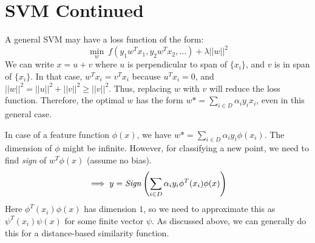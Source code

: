 \documentclass[12pt]{article}
\begin{document}
\section{SVM Continued}

A general SVM may have a loss function of the form:
$$\min_w \ f(y_1w^Tx_1, y_2w^Tx_2, \dots ) + \lambda ||w||^2$$
We can write $x=u+v$ where $u$ is perpendicular to span of $\{x_i\}$, and $v$ is in span of $\{x_i\}$. In that case, $w^Tx_i=v^Tx_i$ because $u^Tx_i=0$, and $||w||^2=||u||^2+||v||^2 \geq ||v||^2$. Thus, replacing $w$ with $v$ will reduce the loss function. Therefore, the optimal $w$ has the form $w*=\sum_{i \in D} \alpha_i y_i x_i$, even in this general case.

\vspace{1 mm}

In case of a feature function $\phi(x)$, we have $w*=\sum_{i \in D} \alpha_i y_i \phi(x_i)$. The dimension of $\phi$ might be infinite. However, for classifying a new point, we need to find \textit{sign} of $w^T \phi(x)$ (assume no bias).$$\implies y=\text{\textit{Sign}} \left (\sum_{i \in D} \alpha_i y_i \phi^T(x_i) \phi(x) \right)$$
Here $\phi^T(x_i) \phi(x)$ has dimension $1$, so we need to approximate this as $\psi^T(x_i) \psi(x)$ for some finite vector $\psi$. As discussed above, we can generally do this for a distance-based similarity function.
\end{document}
